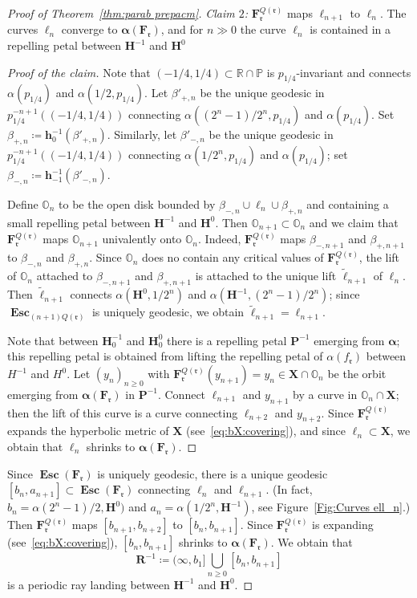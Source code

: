 \documentclass{amsart}
\newcommand{\1}{{\mathbb 1 }}
\newcommand\binfty{{\infty}}%
\newcommand{\bO}{{\mathbb{O}}}
\newcommand{\bF}{{\mathbf F}}
\newcommand{\bX}{{\mathbf X}}
\newcommand{\bR}{{\mathbf R}}
\newcommand{\bP}{{\mathbf P}}
\newcommand{\bH}{{\mathbf H}}
\newcommand{\bbh}{{\mathbf h}}
\newcommand{\rr}{\mathfrak{r}}
\newcommand{\R}{\mathbb{R}}
\newcommand{\Parab}{\mathbb{P}}
\theoremstyle{remark}
\numberwithin{equation}{section}
\theoremstyle{definition}
\newcommand{\Esc}{{\boldsymbol{\operatorname{Esc}}}}
\newcommand{\balpha}{{\boldsymbol \alpha}}
\theoremstyle{nonumberbreak}
\begin{document}
\begin{proof}[Proof of Theorem~\ref{thm:parab prepacm}]
\emph{Claim $2$:} $\bF^{Q(\rr)}_\rr$ maps $\ell_{n+1}$ to $\ell_{n}$.  The curves $\ell_n$ converge to $\balpha(\bF_\rr)$, and for $n\gg 0$ the curve $\ell_n$ is contained in a repelling petal between $\bH^{-1}$ and $\bH^0$ 
\begin{proof}[Proof of the claim]
Note that $(-1/4,1/4)\subset \R\cap \Parab$ is $p_{1/4}$-invariant and connects $\alpha(p_{1/4})$ and $\alpha(1/2,p_{1/4})$. Let $\beta'_{+,n}$ be the unique geodesic in $p_{1/4}^{-n+1}( (-1/4,1/4) )$ connecting $\alpha((2^n-1)/2^n,p_{1/4})$ and $\alpha(p_{1/4})$. Set $\beta_{+,n}\coloneqq \bbh^{-1}_0(\beta'_{+,n})$. Similarly, let $\beta'_{-,n}$ be the unique geodesic in $p_{1/4}^{-n+1}( (-1/4,1/4) )$ connecting $\alpha(1/2^n,p_{1/4})$ and $\alpha(p_{1/4})$; set $\beta_{-,n}\coloneqq \bbh^{-1}_{-1}(\beta'_{-,n})$.

Define $\bO_n$ to be the open disk bounded by $\beta_{-,n}\cup \ell_n\cup \beta_{+,n}$ and containing a small repelling petal between $\bH^{-1}$ and $\bH^0$. Then $\bO_{n+1}\subset \bO_n$ and we claim that $\bF_\rr^{Q(\rr)} $ maps $\bO_{n+1}$ univalently onto $\bO_{n}$. Indeed, $\bF_\rr^{Q(\rr)} $  maps  $\beta_{-,n+1}$ and $\beta_{+,n+1}$ to  $\beta_{-,n}$ and $\beta_{+,n}$. Since $\bO_n$  does no contain any critical values of $\bF_\rr^{Q(\rr)}$, the lift of $\bO_n$ attached to $\beta_{-,n+1}$ and $\beta_{+,n+1}$ is attached to the unique lift $\widetilde \ell_{n+1}$ of $\ell_n$. Then $\widetilde \ell_{n+1}$ connects $\alpha(\bH^0,1/2^n)$ and $\alpha(\bH^{-1},(2^n-1)/2^n)$; since $\Esc_{(n+1)Q(\rr)}$ is uniquely geodesic, we obtain $\widetilde \ell_{n+1}=\ell_{n+1}$. 


Note that between $\bH^{-1}_0$ and $\bH^0_0$ there is a repelling petal $\bP^{-1}$ emerging from $\balpha$; this repelling petal is obtained from lifting the repelling petal of $\alpha(f_\rr)$ between $H^{-1}$ and $H^0$.  Let $(y_n)_{n\ge 0}$ with $\bF^{Q(\rr)}_{\rr}(y_{n+1})=y_n\in \bX\cap \bO_n$ be the orbit emerging from $\balpha(\bF_\rr)$ in $\bP^{-1}$. Connect $\ell_{n+1}$ and $y_{n+1}$ by a curve in $\bO_n\cap \bX$; then the lift of this curve is a curve connecting $\ell_{n+2}$ and $y_{n+2}.$  Since $\bF_\rr^{Q(\rr)}$ expands the hyperbolic metric of $\bX$ (see~\eqref{eq:bX:covering}), and since $ {\ell_n}\subset \bX$, we obtain that $\ell_n$ shrinks to $\balpha(\bF_\rr)$.
\end{proof}



Since $\Esc(\bF_\rr)$ is uniquely geodesic, there is a unique geodesic $[b_n,a_{n+1}]\subset \Esc(\bF_\rr)$ connecting $\ell_n$ and $\ell_{n+1}$. (In fact, $b_n=\alpha(2^n-1)/2,\bH^{0})$ and $a_n=\alpha(1/2^n,\bH^{-1})$, see Figure~\ref{Fig:Curves ell_n}.) Then $\bF_\rr^{Q(\rr)}$ maps $[b_{n+1},b_{n+2}]$ to $[b_{n},b_{n+1}]$. Since $\bF_\rr^{Q(\rr)}$ is expanding (see~\eqref{eq:bX:covering}), $[b_{n},b_{n+1}]$ shrinks to $\balpha(\bF_\rr)$. We obtain that
\[\bR^{-1}\coloneqq (\binfty,b_1]\bigcup_{n\ge 0}[b_n,b_{n+1}] \]
is a periodic ray landing between $\bH^{-1}$ and $\bH^{0}$.


\end{proof}
\end{document}

